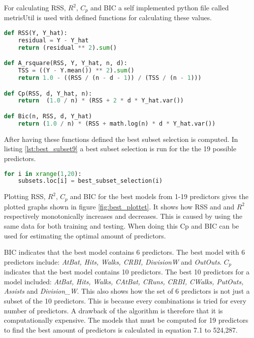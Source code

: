 For calculating RSS, $R^2$, $C_p$ and BIC a self implemented python file called metrisUtil is used with defined functions for calculating these values.

\begin{lstlisting}[language=Python, label=lst:metricsUtil, caption=metricsUtil for calculating Cp\, BIC and RSS]
def RSS(Y, Y_hat):
	residual = Y - Y_hat
	return (residual ** 2).sum()

def A_rsquare(RSS, Y, Y_hat, n, d):
	TSS = ((Y - Y.mean()) ** 2).sum()
	return 1.0 - ((RSS / (n - d - 1)) / (TSS / (n - 1)))

def Cp(RSS, d, Y_hat, n):
	return  (1.0 / n) * (RSS + 2 * d * Y_hat.var())

def Bic(n, RSS, d, Y_hat)
	return (1.0 / n) * (RSS + math.log(n) * d * Y_hat.var())
\end{lstlisting}

After having these functions defined the best subset selection is computed. In listing \ref{lst:best_subset9} a best subset selection is run for the the 19 possible predictors.

\begin{lstlisting}[language=Python, label=lst:best_subset9, caption=metricsUtil for calculating Cp\, BIC and RSS]
for i in xrange(1,20):
	subsets.loc[i] = best_subset_selection(i)
\end{lstlisting}

Plotting RSS, $R^2$, $C_p$ and BIC for the best models from 1-19 predictors gives the plotted graphs shown in figure \ref{fig:best_plottet}. It shows how RSS and and $R^2$ respectively monotonically increases and decreases. This is caused by using the same data for both training and testing. When doing this Cp and BIC can be used for estimating the optimal amount of predictors.

\FloatBarrier


BIC indicates that the best model contains 6 predictors. The best model with 6 predictors include: \emph{AtBat, Hits, Walks, CRBI, DiwisionW} and \emph{OutOuts}. $C_p$ indicates that the best model contains 10 predictors. The best 10 predictors for a model included: \emph{AtBat, Hits, Walks, CAtBat, CRuns, CRBI, CWalks, PutOuts, Assists} and \emph{Division\_W}. This also shows how the set of 6 predictors is not just a subset of the 10 predictors. This is because every combinations is tried for every number of predictors. A drawback of the algorithm is therefore that it is computationally expensive. The models that must be computed for 19 predictors to find the best amount of predictors is calculated in equation 7.1 to 524,287.

